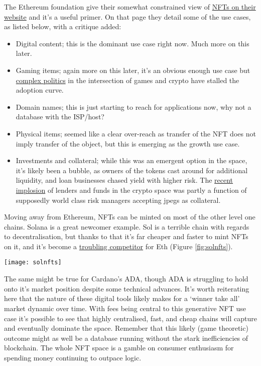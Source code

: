 The Ethereum foundation give their somewhat constrained view of \href{https://ethereum.org/en/nft/}{NFTs on their website} and it's a useful primer. On that page they detail some of the use cases, as listed below, with a critique added:
\begin{itemize}
\item Digital content; this is the dominant use case right now. Much more on this later.
\item Gaming items; again more on this later, it's an obvious enough use case but \href{https://climatereplay.org/nfts/nft-digital-ownership-pledge/}{complex politics} in the intersection of games and crypto have stalled the adoption curve.
\item Domain names; this is just starting to reach for applications now, why not a database with the ISP/host?
\item Physical items; seemed like a clear over-reach as transfer of the NFT does not imply transfer of the object, but this is emerging as the growth use case.
\item Investments and collateral; while this was an emergent option in the space, it's likely been a bubble, as owners of the tokens cast around for additional liquidity, and loan businesses chased yield with higher risk. The \href{https://newsletter.banklesshq.com/p/three-arrows-capital-grayscale-maker-lido}{recent implosion} of lenders and funds in the crypto space was partly a function of supposedly world class risk managers accepting jpegs as collateral.
\end{itemize}
Moving away from Ethereum, NFTs can be minted on most of the other level one chains. Solana is a great newcomer example. Sol is a terrible chain with regards to decentralisation, but thanks to that it's far cheaper and faster to mint NFTs on it, and it's become a \href{https://markets.businessinsider.com/news/currencies/ethereum-eth-killers-nfts-defi-solana-cardano-wax-crypto-investing-2022-1}{troubling competitor} for Eth (Figure \ref{fig:solnfts}).\par 
\begin{figure*}[ht]\centering %
	\texttt{[image: solnfts]}
	\caption{Solana NFT markets are enjoying growth compared to Opensea on Ethereum, even in the downturn.}
	\label{fig:solnfts}
\end{figure*}
The same might be true for Cardano's ADA, though ADA is struggling to hold onto it's market position despite some technical advances. It's worth reiterating here that the nature of these digital tools likely makes for a `winner take all' market dynamic over time. With fees being central to this generative NFT use case it's possible to see that highly centralised, fast, and cheap chains will capture and eventually dominate the space. Remember that this likely (game theoretic) outcome might as well be a database running without the stark inefficiencies of blockchain. The whole NFT space is a gamble on consumer enthusiasm for spending money continuing to outpace logic.\par 
